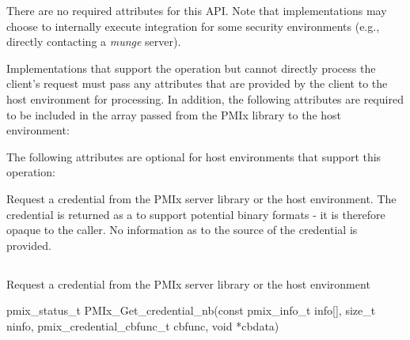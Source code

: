 \reqattrstart
There are no required attributes for this \ac{API}. Note that implementations may choose to internally
execute integration for some security environments (e.g., directly
contacting a \textit{munge} server).

Implementations that support the operation but cannot directly process the client's request must pass any attributes that are provided by the client to the host environment for processing. In addition, the following attributes are required to be included in the  array passed from the \ac{PMIx} library to the host environment:


\reqattrend

\optattrstart
The following attributes are optional for host environments that support this operation:


\optattrend

\descr

Request a credential from the \ac{PMIx} server library or the host environment. The credential is returned as a  to support potential binary formats - it is therefore opaque to the caller. No information as to the source of the credential is provided.


\subsection{}

\summary

Request a credential from the \ac{PMIx} server library or the host environment

\format

\cspecificstart
\begin{codepar}
pmix_status_t
PMIx_Get_credential_nb(const pmix_info_t info[], size_t ninfo,
                       pmix_credential_cbfunc_t cbfunc, void *cbdata)
\end{codepar}
\cspecificend

\begin{arglist}
\end{arglist}

